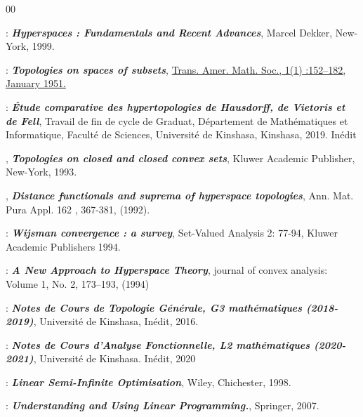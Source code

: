\documentclass[11pt]{report}
\theoremstyle{styletheorem}
\theoremstyle{styledef}
\theoremstyle{remark}
\begin{document}
	\begin{thebibliography}{00}
		
		  : \textbf{\textit{Hyperspaces : Fundamentals and Recent Advances}}, Marcel Dekker, New-York, 1999.
		
		 : \textbf{\textit{Topologies on spaces of subsets}}, \url{Trans. Amer. Math. Soc., 1(1) :152–182, January 1951.}
		
		: \textbf{\textit{Étude comparative des hypertopologies de Hausdorff, de Vietoris et de Fell}}, Travail de fin de cycle de Graduat, Département de Mathématiques et Informatique, Faculté de Sciences, Université de Kinshasa, Kinshasa, 2019. Inédit
		
		 , \textbf{\textit{Topologies on closed and closed convex sets}}, Kluwer Academic Publisher, New-York, 1993.
		
		 , \textbf{\textit{Distance functionals and suprema of hyperspace topologies}}, Ann. Mat. Pura Appl. 162 , 367-381, (1992).
		
		   : \textbf{\textit{Wijsman convergence : a survey}}, Set-Valued Analysis 2: 77-94, Kluwer Academic Publishers 1994.
		
		
		   : \textbf{\textit{A New Approach to Hyperspace Theory}}, journal of convex analysis: Volume 1, No. 2, 173–193, (1994)
		
		 : \textbf{\textit{Notes de Cours de Topologie Générale, G3 mathématiques (2018-2019)}}, Université de Kinshasa, Inédit, 2016.
		
		  : \textbf{\textit{Notes de Cours d'Analyse Fonctionnelle, L2 mathématiques (2020-2021)}}, Université de Kinshasa. Inédit, 2020
		
		 : \textbf{\textit{Linear Semi-Infinite Optimisation}}, Wiley, Chichester, 1998.
		
		
		
		 : \textbf{\textit{Understanding and Using Linear Programming.}}, Springer, 2007.
		

\end{thebibliography}
\end{document}

